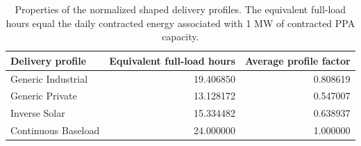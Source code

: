 \begin{table}[p]
\centering
\small
\caption{Properties of the normalized shaped delivery profiles. The equivalent full-load hours equal the daily contracted energy associated with 1 MW of contracted PPA capacity.}
\label{tab:ppa_delivery_profile_metrics}
\begin{tabular*}{\textwidth}{@{\extracolsep{\fill}}lrr@{}}
\toprule
Delivery profile & Equivalent full-load hours & Average profile factor \\
\midrule
Generic Industrial & 19.406850 & 0.808619 \\
Generic Private & 13.128172 & 0.547007 \\
Inverse Solar & 15.334482 & 0.638937 \\
Continuous Baseload & 24.000000 & 1.000000 \\
\bottomrule
\end{tabular*}
\end{table}
